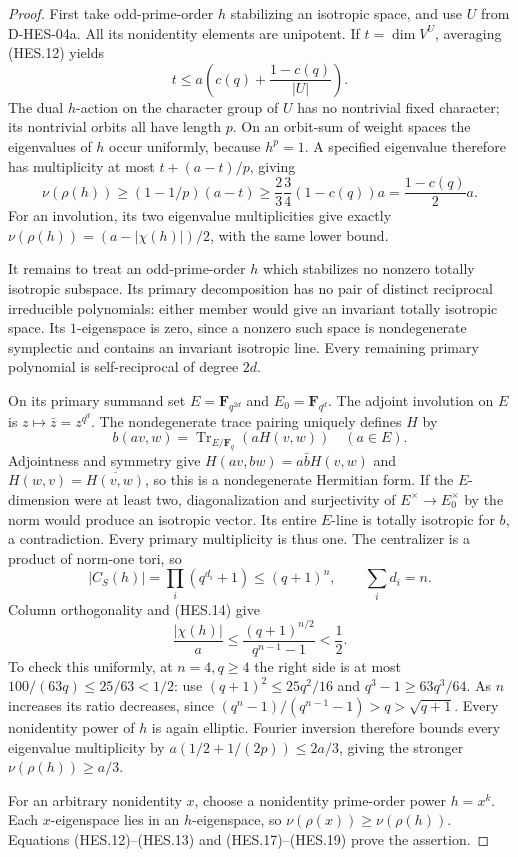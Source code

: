 \begin{proof}
First take odd-prime-order $h$ stabilizing an isotropic space, and use
$U$ from D-HES-04a. All its nonidentity elements are unipotent. If
$t=\dim V^U$, averaging (HES.12) yields
\[
       t\le a\left(c(q)+\frac{1-c(q)}{|U|}\right).
\]
The dual $h$-action on the character group of $U$ has no nontrivial
fixed character; its nontrivial orbits all have length $p$. On an
orbit-sum of weight spaces the eigenvalues of $h$ occur uniformly,
because $h^p=1$. A specified eigenvalue therefore has multiplicity at
most $t+(a-t)/p$, giving
\[
 \nu(\rho(h))\ge(1-1/p)(a-t)
       \ge\frac23\frac34(1-c(q))a=\frac{1-c(q)}2a.
\tag{HES.17}
\]
For an involution, its two eigenvalue multiplicities give exactly
$\nu(\rho(h))=(a-|\chi(h)|)/2$, with the same lower bound.

It remains to treat an odd-prime-order $h$ which stabilizes no nonzero
totally isotropic subspace. Its primary decomposition has no pair of
distinct reciprocal irreducible polynomials: either member would give
an invariant totally isotropic space. Its $1$-eigenspace is zero,
since a nonzero such space is nondegenerate symplectic and contains
an invariant isotropic line. Every remaining primary polynomial is
self-reciprocal of degree $2d$.

On its primary summand set $E=\mathbf F_{q^{2d}}$ and
$E_0=\mathbf F_{q^d}$. The adjoint involution on $E$ is
$z\mapsto\bar z=z^{q^d}$. The nondegenerate trace pairing uniquely
defines $H$ by
\[
 b(av,w)=\operatorname{Tr}_{E/\mathbf F_q}(aH(v,w))
                       \quad(a\in E).
\]
Adjointness and symmetry give
$H(av,bw)=a\bar bH(v,w)$ and
$H(w,v)=\overline{H(v,w)}$, so this is a nondegenerate Hermitian form.
If the $E$-dimension were at least two, diagonalization and surjectivity
of $E^\times\to E_0^\times$ by the norm would produce an isotropic
vector. Its entire $E$-line is totally isotropic for $b$, a contradiction.
Every primary multiplicity is thus one. The centralizer is a product
of norm-one tori, so
\[
               |C_S(h)|=\prod_i(q^{d_i}+1)\le(q+1)^n,
                      \qquad\sum_i d_i=n.
\tag{HES.18}
\]
Column orthogonality and (HES.14) give
\[
          \frac{|\chi(h)|}{a}
             \le\frac{(q+1)^{n/2}}{q^{n-1}-1}<\frac12.
\tag{HES.19}
\]
To check this uniformly, at $n=4,q\ge4$ the right side is at most
$100/(63q)\le25/63<1/2$: use
$(q+1)^2\le25q^2/16$ and $q^3-1\ge63q^3/64$.
As $n$ increases its ratio decreases, since
$(q^n-1)/(q^{n-1}-1)>q>\sqrt{q+1}$.
Every nonidentity power of $h$ is again elliptic. Fourier inversion
therefore bounds every eigenvalue multiplicity by
$a(1/2+1/(2p))\le2a/3$, giving the stronger $\nu(\rho(h))\ge a/3$.

For an arbitrary nonidentity $x$, choose a nonidentity prime-order
power $h=x^k$. Each $x$-eigenspace lies in an $h$-eigenspace, so
$\nu(\rho(x))\ge\nu(\rho(h))$. Equations (HES.12)--(HES.13) and
(HES.17)--(HES.19) prove the assertion.
\end{proof}


